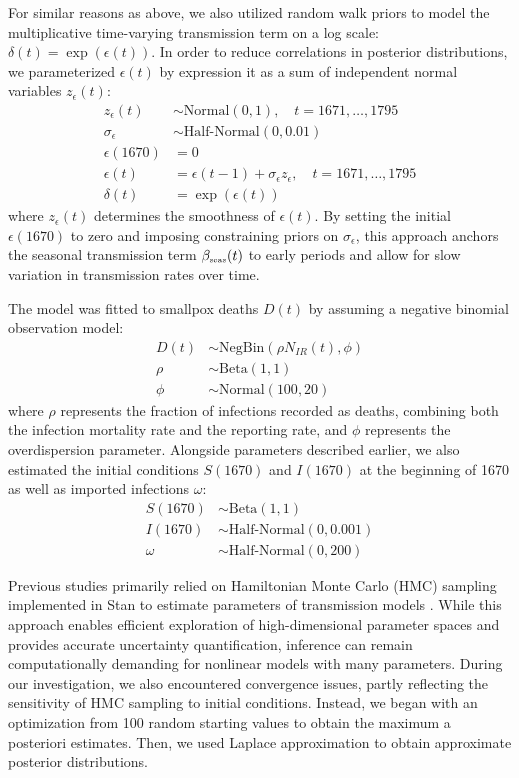 \documentclass[12pt]{article}
\newcommand{\tsub}[2]{#1_{{\textrm{\tiny #2}}}}
\begin{document}
For similar reasons as above, we also utilized random walk priors to model the multiplicative time-varying transmission term on a log scale: $\delta(t) = \exp(\epsilon(t))$.
In order to reduce correlations in posterior distributions, we parameterized $\epsilon(t)$ by expression it as a sum of independent normal variables $z_\epsilon(t)$:
\begin{align}
z_\epsilon(t) &\sim \mathrm{Normal}(0, 1), \quad t = 1671, \dots, 1795 \\
\sigma_\epsilon &\sim \textrm{Half-Normal}(0, 0.01)\\
\epsilon(1670) &= 0\\
\epsilon(t) &= \epsilon(t-1) + \sigma_\epsilon z_\epsilon, \quad t = 1671, \dots, 1795 \\
\delta(t) &= \exp(\epsilon(t))
\end{align}
where $z_\epsilon(t)$ determines the smoothness of $\epsilon(t)$. By setting the initial $\epsilon(1670)$ to zero and imposing constraining priors on $\sigma_\epsilon$, this approach anchors the seasonal transmission term $\tsub{\beta}{seas}(t)$ to early periods and allow for slow variation in transmission rates over time.

The model was fitted to smallpox deaths $D(t)$ by assuming a negative binomial observation model:
\begin{align}
D(t) &\sim \textrm{NegBin}(\rho N_{IR}(t), \phi)\\
\rho &\sim \textrm{Beta}(1,1)\\
\phi &\sim \textrm{Normal}(100, 20)
\end{align}
where $\rho$ represents the fraction of infections recorded as deaths, combining both the infection mortality rate and the reporting rate, and $\phi$ represents the overdispersion parameter.
Alongside parameters described earlier, we also estimated the initial conditions $S(1670)$ and $I(1670)$ at the beginning of 1670 as well as imported infections $\omega$:
\begin{align}
S(1670) &\sim \textrm{Beta}(1, 1)\\
I(1670) &\sim \textrm{Half-Normal}(0,0.001)\\
\omega &\sim \textrm{Half-Normal}(0, 200)
\end{align}

Previous studies primarily relied on Hamiltonian Monte Carlo (HMC) sampling implemented in Stan to estimate parameters of transmission models \citep{park2024predicting,nielsen2025complex,park2025interplay}.
While this approach enables efficient exploration of high-dimensional parameter spaces and provides accurate uncertainty quantification, inference can remain computationally demanding for nonlinear models with many parameters. 
During our investigation, we also encountered convergence issues, partly reflecting the sensitivity of HMC sampling to initial conditions.
Instead, we began with an optimization from 100 random starting values to obtain the maximum a posteriori estimates.
Then, we used Laplace approximation to obtain approximate posterior distributions.
\end{document}
